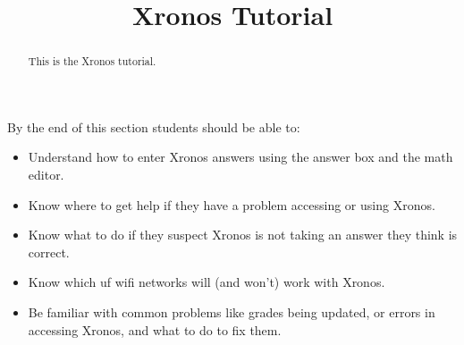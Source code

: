 \documentclass{ximera}
\title{Xronos Tutorial}
\begin{document}
\begin{abstract}
This is the Xronos tutorial.
\end{abstract}
\maketitle
By the end of this section students should be able to:

\begin{itemize}
\item Understand how to enter Xronos answers using the answer box and the math editor.
\item Know where to get help if they have a problem accessing or using Xronos.
\item Know what to do if they suspect Xronos is not taking an answer they think is correct.
\item Know which uf wifi networks will (and won't) work with Xronos.
\item Be familiar with common problems like grades being updated, or errors in accessing Xronos, and what to do to fix them.
\end{itemize}
\end{document}
